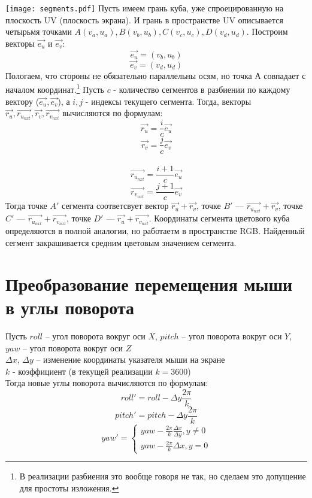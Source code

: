 \documentclass[a4paper,11pt]{article}
\begin{document}
  \texttt{[image: segments.pdf]}
  \linebreak 
   Пусть имеем грань куба, уже спроецированную на плоскость UV (плоскость экрана). И грань в пространстве UV описывается четырьмя точками $A(v_a,u_a), B(v_b,u_b), C(v_c,u_c), D(v_d,u_d)$. Построим векторы $\vec{e_u}$ и $\vec{e_v}$:
   \[ \vec{e_u} =  (v_b,u_b)\]
   \[ \vec{e_v} = (v_d,u_d)\]
   Пологаем, что стороны не обязательно параллельны осям, но точка $А$ совпадает с началом координат.\footnote{В реализации разбиения это вообще говоря не так, но сделаем это допущение для простоты изложения.} Пусть $c$ - количество сегментов в разбиении по каждому вектору ($\vec{e_u}, \vec{e_v}$), а $i,j$ - индексы текущего сегмента. Тогда, векторы $\vec{r_u}, \vec{r_{u_{nxt}}}, \vec{r_v}, \vec{r_{v_{nxt}}}$ вычисляются по формулам:
  \[ \vec{r_u} = \frac{i}{c}\vec{e_u} \]
  \[ \vec{r_v} = \frac{j}{c}\vec{e_v} \]   
   \\
   \[ \vec{r_{u_{nxt}}} = \frac{i+1}{c}\vec{e_u} \]
   \[ \vec{r_{v_{nxt}}} = \frac{j+1}{c}\vec{e_v} \]
Тогда точке $A'$ сегмента соответсвует вектор $\vec{r_u}+\vec{r_v}$, точке $B'$ --- $\vec{r_{u_{nxt}}}+\vec{r_v}$, точке $C'$ --- $\vec{r_{u_{nxt}}}+\vec{r_{v_{nxt}}}$, точке $D'$ --- $\vec{r_u}+\vec{r_{v_{nxt}}}$.
  Координаты сегмента цветового куба определяются в полной аналогии, но работаетм в пространстве RGB. Найденный сегмент закрашивается средним цветовым значением сегмента. 
  
  
  \section{Преобразование перемещения мыши в углы поворота}
  Пусть $roll$ -- угол поворота вокруг оси $X$, $pitch$ -- угол поворота вокруг оси $Y$, $yaw$ -- угол поворота вокруг оси $Z$ \\
  $\varDelta x$, $\varDelta y$ -- изменение координаты указателя мыши на экране \\
  $k$ - коэффициент (в текущей реализации $k  = 3600$) \\
  Тогда новые углы поворота вычисляются по формулам: \\  
  \[ roll' = roll  -\varDelta y\frac{2\pi }{k} \] 
  \[ pitch' = pitch - \varDelta y\frac{2\pi }{k} \]
  \[ yaw' = \begin{cases}
    yaw - \frac{2\pi}{k} \frac{\varDelta x} {\varDelta y}, y\neq 0 \\
    yaw - \frac{2\pi}{k} \varDelta x , y = 0
  \end{cases} \]  
  
\end{document}
